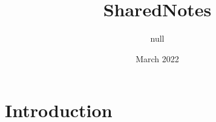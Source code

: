 \documentclass{article}
\title{SharedNotes}
\author{null}
\date{March 2022}
\begin{document}
\maketitle

\section{Introduction}
\end{document}
